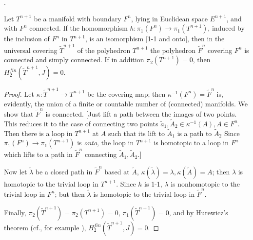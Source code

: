 \documentclass{amsart}
\theoremstyle{plain}
\theoremstyle{definition}
\begin{document}
.
\begin{lem}\label{Lemma 20} Let $T^{n+1}$ be a manifold with
boundary $F^n$, lying in Euclidean space $E^{n+1}$, and with
$F^n$ connected. If the homomorphism $h: \pi_1(F^n) \to
\pi_1(T^{n+1})$, induced by the inclusion of $F^n$ in $T^{n+1}$,
is an isomorphism [1-1 and onto], then in the universal covering
$\tilde T^{n+1}$ of the polyhedron $T^{n+1}$ the polyhedron
$\tilde F^n$ covering $F^n$ is connected and simply connected.
If in addition $\pi_2(T^{n+1}) = 0$, then
$H^{fin}_2(\tilde T^{n+1}, J) = 0$.
\end{lem}
\begin{proof} Let $\kappa : \tilde T^{n+1} \to T^{n+1}$ be the
covering map; then $\kappa^{-1}(F^n) = \tilde F^n$ is, evidently,
the union of a finite or countable number of (connected)
manifolds. We show that $\tilde F^n$ is connected. [Just lift a
path between the images of two points. This reduces it to the
case of connecting two points $\tilde a_1, \tilde A_2 \in
\kappa^{-1}(A), A\in F^n$. Then there is a loop in $T^{n+1}$ at $A$
such that its lift to $\tilde A_1$ is a path to $\tilde A_2$
Since $\pi_1(F^n) \to \pi_1(T^{n+1})$ is {\em onto}, the loop in
$T^{n+1}$ is homotopic to a loop in $F^n$ which lifts to a path
in $\tilde F^n$ connecting $\tilde A_1, \tilde A_2$.]

Now let $\tilde \lambda$ be a closed path in $\tilde F^n$ based
at $\tilde A$, $\kappa(\tilde \lambda) = \lambda, \kappa(\tilde A) =
A$; then $\lambda$ is homotopic to the trivial loop in $T^{n+1}$.
Since $h$ is 1-1, $\lambda$ is nonhomotopic to the trivial loop in
$F^n$; but then $\tilde \lambda$ is homotopic to the trivial loop
in $\tilde F^n$.

Finally, $\pi_2(\tilde T^{n+1}) = \pi_2(T^{n+1}) = 0$,
$\pi_1(\tilde T^{n+1}) = 0$, and by Hurewicz's theorem (cf.,
for example \cite[p. 57]{H}), $H^{fin}_2(\tilde T^{n+1}, J) = 0$.
\end{proof}
\end{document}
